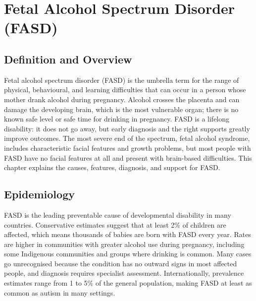 \chapter{Fetal Alcohol Spectrum Disorder (FASD)}

\section*{Definition and Overview}
Fetal alcohol spectrum disorder (FASD) is the umbrella term for the range of physical, behavioural, and learning difficulties that can occur in a person whose mother drank alcohol during pregnancy. Alcohol crosses the placenta and can damage the developing brain, which is the most vulnerable organ; there is no known safe level or safe time for drinking in pregnancy. FASD is a lifelong disability: it does not go away, but early diagnosis and the right supports greatly improve outcomes. The most severe end of the spectrum, fetal alcohol syndrome, includes characteristic facial features and growth problems, but most people with FASD have no facial features at all and present with brain-based difficulties. This chapter explains the causes, features, diagnosis, and support for FASD.

\section*{Epidemiology}
FASD is the leading preventable cause of developmental disability in many countries. Conservative estimates suggest that at least 2\% of children are affected, which means thousands of babies are born with FASD every year. Rates are higher in communities with greater alcohol use during pregnancy, including some Indigenous communities and groups where drinking is common. Many cases go unrecognised because the condition has no outward signs in most affected people, and diagnosis requires specialist assessment. Internationally, prevalence estimates range from 1 to 5\% of the general population, making FASD at least as common as autism in many settings.

